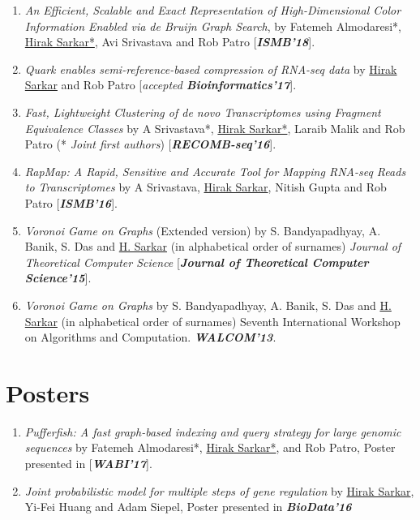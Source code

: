 \documentclass{res}
\begin{document}
\begin{resume}
\begin{enumerate}
\item {\it An Efficient, Scalable and Exact Representation of High-Dimensional Color Information Enabled via de Bruijn Graph Search}, by Fatemeh Almodaresi*, \underline{Hirak Sarkar*}, Avi Srivastava and Rob Patro [\textit{\textbf{ISMB'18}}]. 

\item   {\it Quark enables semi-reference-based compression of RNA-seq data} by  \underline{Hirak Sarkar} and Rob Patro [\textit{accepted \textbf {Bioinformatics'17}}].


\item   {\it Fast, Lightweight Clustering of de novo Transcriptomes using Fragment Equivalence Classes} by A Srivastava*, \underline{Hirak Sarkar*}, Laraib Malik and Rob Patro (* \textit{Joint first authors}) [\textit{\textbf{RECOMB-seq'16}}]. 


\item {\it RapMap: A Rapid, Sensitive and Accurate Tool for Mapping RNA-seq Reads to Transcriptomes} by A Srivastava, \underline{Hirak Sarkar}, Nitish Gupta and Rob Patro  [\textit{\textbf{ISMB'16}}].

\item {\it Voronoi Game on Graphs} (Extended version) by S. Bandyapadhyay, A. Banik, S. Das and \underline{H. Sarkar} (in alphabetical order of surnames) {\it Journal of Theoretical Computer Science}  [\textit{\textbf{Journal of Theoretical Computer Science'15}}].

\item {\it Voronoi Game on Graphs} by  S. Bandyapadhyay, A. Banik, S. Das and \underline{H. Sarkar} (in alphabetical order of surnames) Seventh International Workshop on Algorithms and Computation. \textit{\textbf{WALCOM'13}}.
\end{enumerate}

\vspace{-0.5cm}
\section{Posters}
\begin{enumerate}
\item {\it Pufferfish: A fast graph-based indexing and query strategy for large genomic sequences} by Fatemeh Almodaresi*, \underline{Hirak Sarkar*}, and Rob Patro, Poster presented in [\textit{\textbf{WABI'17}}].

\item {\it Joint probabilistic model for multiple steps of gene regulation} by \underline{Hirak Sarkar}, Yi-Fei Huang and Adam Siepel, Poster presented in  \textit{\textbf{BioData'16}}
\vspace{-0.5cm}
\end{enumerate}



\end{resume}
\end{document}
